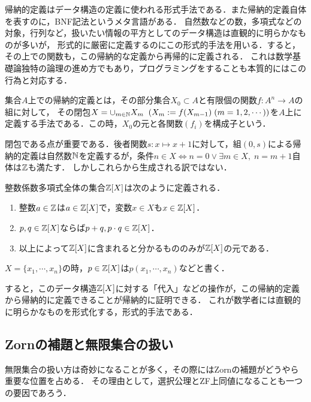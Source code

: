 \documentclass[uplatex, dvipdfmx]{jsreport}
\begin{document}
\begin{screen}
    帰納的定義はデータ構造の定義に使われる形式手法である．また帰納的定義自体を表すのに，BNF記法というメタ言語がある．
    自然数などの数，多項式などの対象，行列など，扱いたい情報の平方としてのデータ構造は直観的に明らかなものが多いが，
    形式的に厳密に定義するのにこの形式的手法を用いる．すると，その上での関数も，この帰納的な定義から再帰的に定義される．
    これは数学基礎論独特の論理の進め方でもあり，プログラミングをすることも本質的にはこの行為と対応する．
\end{screen}

\begin{definition}
    集合$A$上での帰納的定義とは，その部分集合$X_0\subset A$と有限個の関数$f:A^n\to A$の組に対して，
    その閉包$X=\cup_{m\in\mathbb{N}}X_m\;\;(X_m:=f(X_{m-1})\;(m=1,2,\cdots))$を$A$上に定義する手法である．この時，$X_0$の元と各関数$(f_i)$を構成子という．
\end{definition}
\begin{remark}
    閉包である点が重要である．後者関数$s:x\mapsto x+1$に対して，組$(0,s)$による帰納的定義は自然数$\mathbb{N}$を定義するが，条件$n\in X\Leftrightarrow n=0\lor\exists m\in X,\; n=m+1$自体は$\mathbb{Z}$も満たす．
    しかしこれらから生成される訳ではない．
\end{remark}
\begin{remark}[多項式]
    整数係数多項式全体の集合$\mathbb{Z}[X]$は次のように定義される．
    \begin{enumerate}
        \item 整数$a\in\mathbb{Z}$は$a\in\mathbb{Z}[X]$で，変数$x\in X$も$x\in\mathbb{Z}[X]$．
        \item $p,q\in\mathbb{Z}[X]$ならば$p+q,p\cdot q\in\mathbb{Z}[X]$．
        \item 以上によって$\mathbb{Z}[X]$に含まれると分かるもののみが$\mathbb{Z}[X]$の元である．
    \end{enumerate}
    $X=\{x_1,\cdots,x_n\}$の時，$p\in\mathbb{Z}[X]$は$p(x_1,\cdots,x_n)$などと書く．

    すると，このデータ構造$\mathbb{Z}[X]$に対する「代入」などの操作が，この帰納的定義から帰納的に定義できることが帰納的に証明できる．
    これが数学者には直観的に明らかなものを形式化する，形式的手法である．
\end{remark}

\subsection{Zornの補題と無限集合の扱い}

無限集合の扱い方は奇妙になることが多く，その際にはZornの補題がどうやら重要な位置を占める．
その理由として，選択公理とZF上同値になることも一つの要因であろう．
\end{document}
